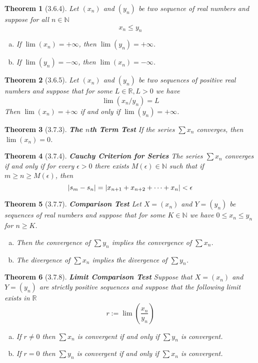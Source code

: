 \documentclass{article}
\newtheorem*{theorem}{Theorem}
\DeclarePairedDelimiter\abs{\lvert}{\rvert}%
\begin{document}
\begin{theorem}[3.6.4] Let $(x_n)$ and $(y_n)$ be two sequence of real numbers and suppose 
  for all $n \in{\mathbb{N}}$
  $$x_n \le y_n$$
  \begin{enumerate}[(a)]
    \item If $\lim(x_n)=+\infty$, then $\lim(y_n)=+\infty$.
    \item If $\lim(y_n)=-\infty$, then $\lim(x_n)=-\infty$.
  \end{enumerate}
\end{theorem}

\begin{theorem}[3.6.5] Let $(x_n)$ and $(y_n)$ be two sequences of positive real numbers 
  and suppose that for some $L \in{\mathbb{R}}, L>0$ we have
  $$\lim(x_n/y_n)=L$$
  Then $\lim(x_n)=+\infty$ if and only if $\lim(y_n)=+\infty$.
\end{theorem}

\begin{theorem}[3.7.3] \textbf{The $n$th Term Test} If the series $\sum{x_n}$ converges,
  then $\lim(x_n)=0$.
\end{theorem}

\begin{theorem}[3.7.4] \textbf{Cauchy Criterion for Series} The series $\sum{x_n}$ converges
  if and only if for every $\epsilon>0$ there exists $M(\epsilon) \in{\mathbb{N}}$ such that 
  if $m\ge n\ge M(\epsilon)$, then
  $$\abs{s_m-s_n} = \abs{x_{n+1}+x_{n+2}+\dots+x_n}<\epsilon$$
\end{theorem}

\begin{theorem}[3.7.7] \textbf{Comparison Test} Let $X=(x_n)$ and $Y=(y_n)$ be sequences of real numbers 
  and suppose that for some $K \in{\mathbb{N}}$ we have
  $0\le x_n\le y_n$ for $n\ge K$.
  \begin{enumerate}[(a)]
    \item Then the convergence of $\sum{y_n}$ implies the convergence of $\sum{x_n}$.
    \item The divergence of $\sum{x_n}$ implies the divergence of $\sum{y_n}$.
  \end{enumerate}
\end{theorem}

\begin{theorem}[3.7.8] \textbf{Limit Comparison Test} Suppose that $X=(x_n)$ and $Y=(y_n)$ are
  strictly positive sequences and suppose that the following limit exists in $\mathbb{R}$
  $$r:=\lim(\frac{x_n}{y_n})$$
  \begin{enumerate}[(a)]
    \item If $r\ne 0$ then $\sum{x_n}$ is convergent if and only if $\sum{y_n}$ is convergent.
    \item If $r=0$ then $\sum{y_n}$ is convergent if and only if $\sum{x_n}$ is convergent.
  \end{enumerate}
\end{theorem}
\end{document}
